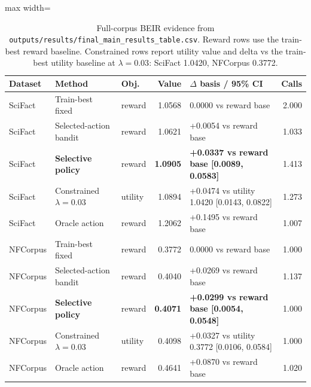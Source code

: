 \begin{table}
  \centering
  \caption{Full-corpus BEIR evidence from \texttt{outputs/results/final\_main\_results\_table.csv}. Reward rows use the train-best reward baseline. Constrained rows report utility value and delta vs the train-best utility baseline at $\lambda=0.03$: SciFact 1.0420, NFCorpus 0.3772.}
  \begin{adjustbox}{max width=\textwidth}
  \begin{tabular}{l l l r l r}
    \toprule
    \textbf{Dataset} & \textbf{Method} & \textbf{Obj.} & \textbf{Value} & \textbf{$\Delta$ basis / 95\% CI} & \textbf{Calls} \\
    \midrule
    SciFact & Train-best fixed & reward & 1.0568 & 0.0000 vs reward base & 2.000 \\
    SciFact & Selected-action bandit & reward & 1.0621 & +0.0054 vs reward base & 1.033 \\
    SciFact & \textbf{Selective policy} & reward & \textbf{1.0905} & \textbf{+0.0337 vs reward base [0.0089, 0.0583]} & 1.413 \\
    SciFact & Constrained $\lambda=0.03$ & utility & 1.0894 & +0.0474 vs utility 1.0420 [0.0143, 0.0822] & 1.273 \\
    SciFact & Oracle action & reward & 1.2062 & +0.1495 vs reward base & 1.007 \\
    \midrule
    NFCorpus & Train-best fixed & reward & 0.3772 & 0.0000 vs reward base & 1.000 \\
    NFCorpus & Selected-action bandit & reward & 0.4040 & +0.0269 vs reward base & 1.137 \\
    NFCorpus & \textbf{Selective policy} & reward & \textbf{0.4071} & \textbf{+0.0299 vs reward base [0.0054, 0.0548]} & 1.000 \\
    NFCorpus & Constrained $\lambda=0.03$ & utility & 0.4098 & +0.0327 vs utility 0.3772 [0.0106, 0.0584] & 1.000 \\
    NFCorpus & Oracle action & reward & 0.4641 & +0.0870 vs reward base & 1.020 \\
    \bottomrule
  \end{tabular}
  \end{adjustbox}
\end{table}
